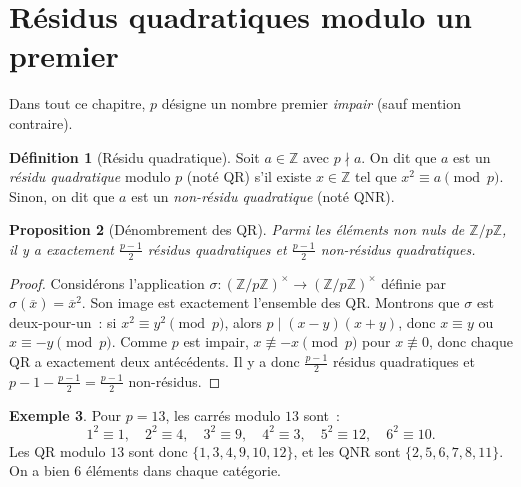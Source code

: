\documentclass[12pt,a4paper,openany]{book}
\theoremstyle{definition}
\newtheorem{definition}{Définition}[chapter]
\newtheorem{exemple}[definition]{Exemple}
\theoremstyle{plain}
\newtheorem{proposition}[definition]{Proposition}
\theoremstyle{remark}
\newcommand{\Z}{\mathbb{Z}}
\begin{document}
\section{Résidus quadratiques modulo un premier}
\label{sec:qr:definition}

Dans tout ce chapitre, $p$ désigne un nombre premier \emph{impair} (sauf mention
contraire).

\begin{definition}[Résidu quadratique]
\label{def:qr}
Soit $a \in \Z$ avec $p \nmid a$. On dit que $a$ est un \emph{résidu quadratique}
modulo $p$ (noté QR) s'il existe $x \in \Z$ tel que $x^2 \equiv a \pmod{p}$.
Sinon, on dit que $a$ est un \emph{non-résidu quadratique} (noté QNR).
\end{definition}

\begin{proposition}[Dénombrement des QR]
\label{prop:denombrement-qr}
Parmi les éléments non nuls de $\Z/p\Z$, il y a exactement $\frac{p-1}{2}$ résidus
quadratiques et $\frac{p-1}{2}$ non-résidus quadratiques.
\end{proposition}

\begin{proof}
Considérons l'application $\sigma : (\Z/p\Z)^\times \to (\Z/p\Z)^\times$
définie par $\sigma(\overline{x}) = \overline{x}^2$. Son image est exactement
l'ensemble des QR. Montrons que $\sigma$ est deux-pour-un~: si $x^2 \equiv y^2 \pmod{p}$,
alors $p \mid (x-y)(x+y)$, donc $x \equiv y$ ou $x \equiv -y \pmod{p}$.
Comme $p$ est impair, $x \not\equiv -x \pmod{p}$ pour $x \not\equiv 0$,
donc chaque QR a exactement deux antécédents. Il y a donc
$\frac{p-1}{2}$ résidus quadratiques et $p - 1 - \frac{p-1}{2} = \frac{p-1}{2}$
non-résidus.
\end{proof}

\begin{exemple}
\label{ex:qr-mod-13}
Pour $p = 13$, les carrés modulo $13$ sont~:
\[
  1^2 \equiv 1, \quad 2^2 \equiv 4, \quad 3^2 \equiv 9, \quad
  4^2 \equiv 3, \quad 5^2 \equiv 12, \quad 6^2 \equiv 10.
\]
Les QR modulo $13$ sont donc $\{1, 3, 4, 9, 10, 12\}$, et les QNR sont
$\{2, 5, 6, 7, 8, 11\}$. On a bien $6$ éléments dans chaque catégorie.
\end{exemple}
\end{document}
